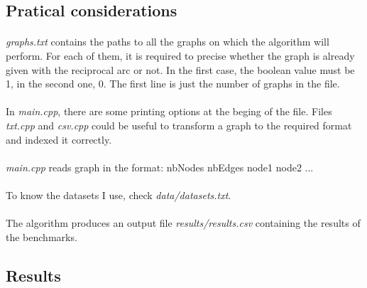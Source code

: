 \documentclass[english]{article}
\begin{document}
\begin{multicols}{2}
\subsection{Pratical considerations}
\paragraph{}
{\it graphs.txt} contains the paths to all the graphs on which the algorithm will perform. For each of them, it is required to precise whether the graph is already given with the reciprocal arc or not. In the first case, the boolean value must be 1, in the second one, 0.
The first line is just the number of graphs in the file.
\paragraph{}
In {\it main.cpp}, there are some printing options at the beging of the file.
Files {\it txt.cpp} and {\it csv.cpp} could be useful to transform a graph to the required format and indexed it correctly. 
\paragraph{}
{\it main.cpp} reads graph in the format:
\newline nbNodes nbEdges
\newline node1 node2
\newline ...
\paragraph{}
To know the datasets I use, check {\it data/datasets.txt}.
\paragraph{}
The algorithm produces an output file {\it results/results.csv} containing the results of the benchmarks.
\subsection{Results}

\end{multicols}
\end{document}
